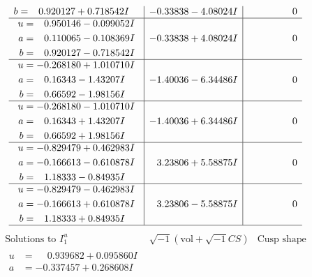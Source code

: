 \documentclass[1p]{elsarticle_modified}
\theoremstyle{definition}
\newcommand{\I}{\sqrt{-1}}
\begin{document}
$$\begin{array}{c|c|c}
\begin{aligned}
b &= \phantom{-}0.920127 + 0.718542 I\end{aligned}
 & -0.33838 - 4.08024 I & \phantom{-0.000000 } 0 \\ \hline\begin{aligned}
u &= \phantom{-}0.950146 - 0.099052 I \\
a &= \phantom{-}0.110065 - 0.108369 I \\
b &= \phantom{-}0.920127 - 0.718542 I\end{aligned}
 & -0.33838 + 4.08024 I & \phantom{-0.000000 } 0 \\ \hline\begin{aligned}
u &= -0.268180 + 1.010710 I \\
a &= \phantom{-}0.16343 - 1.43207 I \\
b &= \phantom{-}0.66592 - 1.98156 I\end{aligned}
 & -1.40036 - 6.34486 I & \phantom{-0.000000 } 0 \\ \hline\begin{aligned}
u &= -0.268180 - 1.010710 I \\
a &= \phantom{-}0.16343 + 1.43207 I \\
b &= \phantom{-}0.66592 + 1.98156 I\end{aligned}
 & -1.40036 + 6.34486 I & \phantom{-0.000000 } 0 \\ \hline\begin{aligned}
u &= -0.829479 + 0.462983 I \\
a &= -0.166613 - 0.610878 I \\
b &= \phantom{-}1.18333 - 0.84935 I\end{aligned}
 & \phantom{-}3.23806 + 5.58875 I & \phantom{-0.000000 } 0 \\ \hline\begin{aligned}
u &= -0.829479 - 0.462983 I \\
a &= -0.166613 + 0.610878 I \\
b &= \phantom{-}1.18333 + 0.84935 I\end{aligned}
 & \phantom{-}3.23806 - 5.58875 I & \phantom{-0.000000 } 0\\
 \hline 
 \end{array}$$\newpage$$\begin{array}{c|c|c}  
\text{Solutions to }I^u_{1}& \I (\text{vol} + \sqrt{-1}CS) & \text{Cusp shape}\\
 \hline 
\begin{aligned}
u &= \phantom{-}0.939682 + 0.095860 I \\
a &= -0.337457 + 0.268608 I \\

\end{aligned}
\end{array}$$
\end{document}
